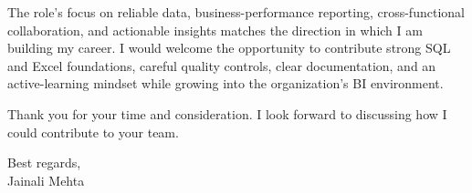 \documentclass[letterpaper,11pt]{article}
\begin{document}
\bigbreak
The role's focus on reliable data, business-performance reporting, cross-functional collaboration, and actionable insights matches the direction in which I am building my career. I would welcome the opportunity to contribute strong SQL and Excel foundations, careful quality controls, clear documentation, and an active-learning mindset while growing into the organization's BI environment.

\bigbreak
Thank you for your time and consideration. I look forward to discussing how I could contribute to your team.

\bigbreak
Best regards,\\
Jainali Mehta
\end{document}
